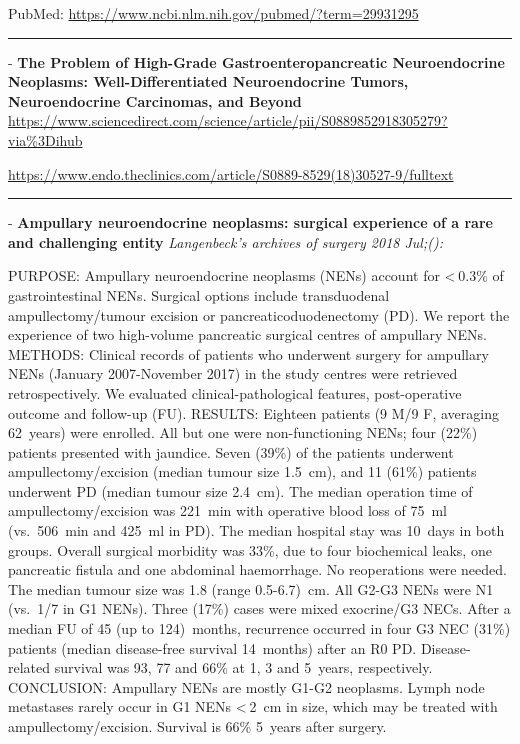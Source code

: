 \documentclass[]{article}
\begin{document}
PubMed: \url{https://www.ncbi.nlm.nih.gov/pubmed/?term=29931295}

{}

{}

\begin{center}\rule{0.5\linewidth}{\linethickness}\end{center}

 - \textbf{The Problem of High-Grade Gastroenteropancreatic
Neuroendocrine Neoplasms: Well-Differentiated Neuroendocrine Tumors,
Neuroendocrine Carcinomas, and Beyond}
\url{https://www.sciencedirect.com/science/article/pii/S0889852918305279?via\%3Dihub}

\url{https://www.endo.theclinics.com/article/S0889-8529(18)30527-9/fulltext}

\begin{center}\rule{0.5\linewidth}{\linethickness}\end{center}

 - \textbf{Ampullary neuroendocrine neoplasms: surgical experience of a
rare and challenging entity} \emph{Langenbeck's archives of surgery 2018
Jul;():}

PURPOSE: Ampullary neuroendocrine neoplasms (NENs) account for
\textless{} 0.3\% of gastrointestinal NENs. Surgical options include
transduodenal ampullectomy/tumour excision or pancreaticoduodenectomy
(PD). We report the experience of two high-volume pancreatic surgical
centres of ampullary NENs. METHODS: Clinical records of patients who
underwent surgery for ampullary NENs (January 2007-November 2017) in the
study centres were retrieved retrospectively. We evaluated
clinical-pathological features, post-operative outcome and follow-up
(FU). RESULTS: Eighteen patients (9 M/9 F, averaging 62~years) were
enrolled. All but one were non-functioning NENs; four (22\%) patients
presented with jaundice. Seven (39\%) of the patients underwent
ampullectomy/excision (median tumour size 1.5~cm), and 11 (61\%)
patients underwent PD (median tumour size 2.4~cm). The median operation
time of ampullectomy/excision was 221~min with operative blood loss of
75~ml (vs.~506~min and 425~ml in PD). The median hospital stay was
10~days in both groups. Overall surgical morbidity was 33\%, due to four
biochemical leaks, one pancreatic fistula and one abdominal haemorrhage.
No reoperations were needed. The median tumour size was 1.8 (range
0.5-6.7)~cm. All G2-G3 NENs were N1 (vs.~1/7 in G1 NENs). Three (17\%)
cases were mixed exocrine/G3 NECs. After a median FU of 45 (up to
124)~months, recurrence occurred in four G3 NEC (31\%) patients (median
disease-free survival 14~months) after an R0 PD. Disease-related
survival was 93, 77 and 66\% at 1, 3 and 5~years, respectively.
CONCLUSION: Ampullary NENs are mostly G1-G2 neoplasms. Lymph node
metastases rarely occur in G1 NENs \textless{} 2~cm in size, which may
be treated with ampullectomy/excision. Survival is 66\% 5~years after
surgery.
\end{document}
